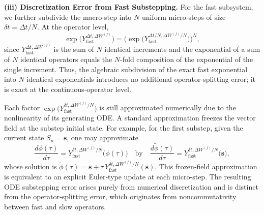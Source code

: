\documentclass{article}
\begin{document}
\vspace{0.1in}
\textbf{(iii) Discretization Error from Fast Substepping.}
For the fast subsystem, we further subdivide the macro-step into $N$ uniform micro‑steps of size $\delta t=\Delta t/N$.  At the operator level,
\begin{equation}
\label{eq:fast_subdivide_exact}
\exp\!\big(Y_{\mathrm{fast}}^{\Delta t,\Delta W^{(f)}}\big)
=
\Big(
\exp\!\big(Y_{\mathrm{fast}}^{\Delta t/N,\Delta W^{(f)}/N}\big)
\Big)^{N},
\end{equation}
since $Y_{\mathrm{fast}}^{\Delta t,\Delta W^{(f)}}$ is the sum
of $N$ identical increments and the exponential of a sum of $N$ identical operators equals the $N$-fold composition of the exponential of the single increment.
Thus, the algebraic subdivision of the exact
fast exponential into $N$ identical exponentials introduces no additional operator‑splitting error; it is exact at the continuous‑operator level.

Each factor $\exp\!\big(Y_{\mathrm{fast}}^{\delta t,\Delta W^{(f)}/N}\big)$ is still approximated numerically due to the nonlinearity of its generating ODE. A standard approximation freezes the vector field at the substep initial state.
For example, for the first substep, given the current state $S_n = \pmb{s}$, one may approximate
\[
\frac{d\phi(\tau)}{d\tau}
=
Y_{\mathrm{fast}}^{\delta t,\Delta W^{(f)}/N}\!\big(\phi(\tau)\big)
\quad\text{by}\quad
\frac{d\tilde\phi(\tau)}{d\tau}
=
Y_{\mathrm{fast}}^{\delta t,\Delta W^{(f)}/N}\!\big(\pmb{s}\big),
\]
whose solution is
\(
\tilde\phi(\tau)
=
\pmb{s}
+
\tau\,Y_{\mathrm{fast}}^{\delta t,\Delta W^{(f)}/N}(\pmb{s}).
\)
This frozen‑field approximation is equivalent to an explicit Euler‑type update at each micro‑step. 
The resulting ODE substepping error arises purely from numerical discretization and is distinct from the operator‑splitting error, which originates from noncommutativity between fast and slow operators.
\end{document}
